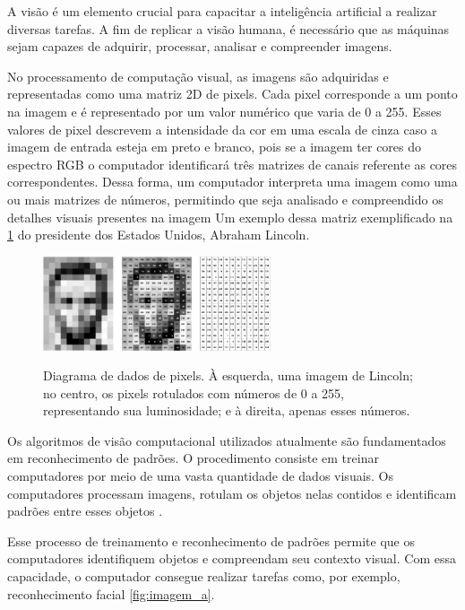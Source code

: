 A visão é um elemento crucial para capacitar a inteligência artificial a realizar diversas tarefas. A fim de replicar a visão humana, é necessário que as máquinas sejam capazes de adquirir, processar, analisar e compreender imagens. \space\cite{como_funciona_visao_computacional}



No processamento de computação visual, as imagens são adquiridas e representadas como uma matriz 2D de pixels. Cada pixel corresponde a um ponto na imagem e é representado por um valor numérico que varia de 0 a 255. Esses valores de pixel descrevem a intensidade da cor em uma escala de cinza caso a imagem de entrada esteja em preto e branco, pois se a imagem ter cores do espectro RGB o computador identificará três matrizes de canais referente as cores correspondentes. Dessa forma, um computador interpreta uma imagem como uma ou mais matrizes de números, permitindo que seja analisado e compreendido os detalhes visuais presentes na imagem Um exemplo dessa matriz exemplificado na \cref{fig:comp_vision} do presidente dos Estados Unidos, Abraham Lincoln\cite{mit_video}.

\begin{figure}[ht]
	\caption{Diagrama de dados de pixels. À esquerda, uma imagem de Lincoln; no centro, os pixels rotulados com números de 0 a 255, representando sua luminosidade; e à direita, apenas esses números.}
	\centering
	\includegraphics[width=0.6\textwidth]{figures/lincoln_pixel_values.png}
  \label{fig:comp_vision}
\end{figure}

Os algoritmos de visão computacional utilizados atualmente são fundamentados em reconhecimento de padrões. O procedimento consiste em treinar computadores por meio de uma vasta quantidade de dados visuais. Os computadores processam imagens, rotulam os objetos nelas contidos e identificam padrões entre esses objetos \space\cite{content_Human_Vision}.

Esse processo de treinamento e reconhecimento de padrões permite que os computadores identifiquem objetos e compreendam seu contexto visual. Com essa capacidade, o computador consegue realizar tarefas como, por exemplo, reconhecimento facial \cref{fig:imagem_a}.



